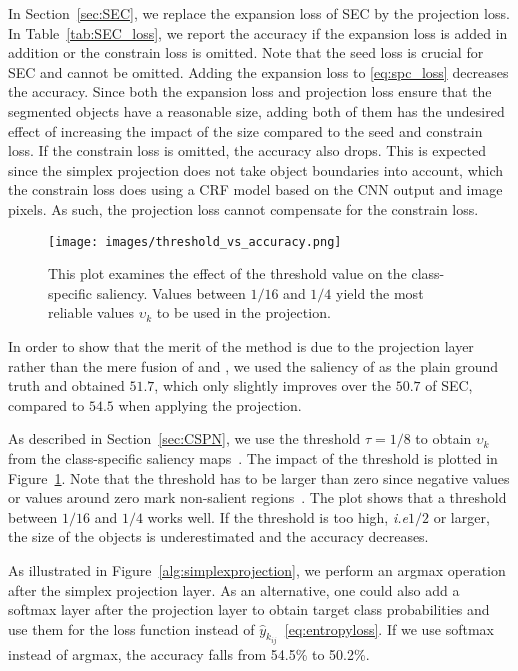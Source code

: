 \documentclass{bmvc2k}
\def\ie{\emph{i.e}\bmvaOneDot}
\begin{document}
 In Section~\ref{sec:SEC}, we replace the expansion loss of SEC by the projection loss. In Table~\ref{tab:SEC_loss}, we report the accuracy if the expansion loss is added in addition or the constrain loss is omitted. Note that the seed loss is crucial for SEC and cannot be omitted. Adding the expansion loss to \eqref{eq:spc_loss} decreases the accuracy. Since both the expansion loss and projection loss ensure that the segmented objects have a reasonable size, adding both of them has the undesired effect of increasing the impact of the size compared to the seed and constrain loss. If the constrain loss is omitted, the accuracy also drops. This is expected since the simplex projection does not take object boundaries into account, which the constrain loss does using a CRF model based on the CNN output and image pixels. As such, the projection loss cannot compensate for the constrain loss.

\begin{figure}[t]
			\centering
			\texttt{[image: images/threshold\_vs\_accuracy.png]}
			\caption{This plot examines the effect of the threshold value on the class-specific saliency. Values between $1/16$ and $1/4$ yield the most reliable values $\upsilon_k$ to be used in the projection.}
			\label{fig:threshold_vs_accuracy}
		\end{figure} 

In order to show that the merit of the method is due to the projection layer rather than the mere fusion of \citep{kolesnikov2016seed} and \citep{Shimoda2016DistinctCS}, we used the saliency of \citep{Shimoda2016DistinctCS} as the plain ground truth and obtained $51.7$, which only slightly improves over the $50.7$ of SEC, compared to $54.5$ when applying the projection.

As described in Section~\ref{sec:CSPN}, we use the threshold $\tau=1/8$ to obtain $\upsilon_k$ from the class-specific saliency maps~\cite{Shimoda2016DistinctCS}. The impact of the threshold is plotted in Figure~\ref{fig:threshold_vs_accuracy}. Note that the threshold has to be larger than zero since negative values or values around zero mark non-salient regions~\cite{Shimoda2016DistinctCS}.  The plot shows that a threshold between $1/16$ and $1/4$ works well. If the threshold is too high, \ie $1/2$ or larger, the size of the objects is underestimated and the accuracy decreases.   


As illustrated in Figure~\ref{alg:simplexprojection}, we perform an argmax operation after the simplex projection layer. As an alternative, one could also add a softmax layer after the projection layer to obtain target class probabilities and use them for the loss function instead of $\hat{y}_{k_{ij}}$~\eqref{eq:entropyloss}. If we use softmax instead of argmax, the accuracy falls from 54.5\% to 50.2\%. 
\end{document}
